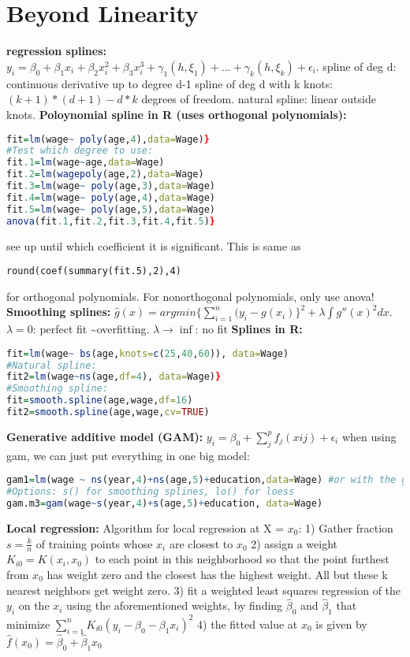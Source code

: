 \section{Beyond Linearity}
\textbf{regression splines: } 
$y_i = \beta_0 + \beta_1x_i + \beta_2x_i^2 + \beta_3x_i^3 + \gamma_1(h, \xi_1) + ... + \gamma_k(h, \xi_k) + \epsilon_i$.
spline of deg d: continuous derivative up to degree d-1
spline of deg d with k knots: $(k+1)*(d+1)-d*k$ degrees of freedom. 
natural spline: linear outside knots. 
\textbf{Poloynomial spline in R (uses orthogonal polynomials):} \begin{lstlisting}[language=R]
fit=lm(wage~ poly(age,4),data=Wage)}
#Test which degree to use:
fit.1=lm(wage~age,data=Wage)
fit.2=lm(wagepoly(age,2),data=Wage)
fit.3=lm(wage~ poly(age,3),data=Wage)
fit.4=lm(wage~ poly(age,4),data=Wage)
fit.5=lm(wage~ poly(age,5),data=Wage)
anova(fit.1,fit.2,fit.3,fit.4,fit.5)}\end{lstlisting} see up until which coefficient it is significant. This is same as \begin{lstlisting}
round(coef(summary(fit.5),2),4)
\end{lstlisting} for orthogonal polynomials. For nonorthogonal polynomials, only use anova!
\textbf{Smoothing splines: } $\hat g(x) = argmin \{\sum_{i=1}^n (y_i - g(x_i)\}^2 + \lambda \int g'' (x)^2 dx$. $\lambda = 0$: perfect fit \textasciitilde overfitting. $\lambda \rightarrow \inf$: no fit 
\textbf{Splines in R:}
\begin{lstlisting}[language=R] 
fit=lm(wage~ bs(age,knots=c(25,40,60)), data=Wage)
#Natural spline: 
fit2=lm(wage~ns(age,df=4), data=Wage)}
#Smoothing spline:
fit=smooth.spline(age,wage,df=16)
fit2=smooth.spline(age,wage,cv=TRUE)
\end{lstlisting}
\textbf{Generative additive model (GAM): } $y_i = \beta_0 + \sum_j^p f_j(xij) + \epsilon_i$
when using gam, we can just put everything in one big model:
\begin{lstlisting}[language=R]
gam1=lm(wage ~ ns(year,4)+ns(age,5)+education,data=Wage) #or with the gam library: 
#Options: s() for smoothing splines, lo() for loess
gam.m3=gam(wage~s(year,4)+s(age,5)+education, data=Wage)\end{lstlisting}

\textbf{Local regression: }
Algorithm for local regression at X = $x_0$: 1) Gather fraction $s = \frac{k}{n}$ of training points whose $x_i$ are closest to $x_0$ 2) assign a weight $K_{i0} = K(x_i, x_0)$ to each point in this neighborhood so that the point furthest from $x_0$ has weight zero and the closest has the highest weight. All but these k nearest neighbors get weight zero. 3) fit a weighted least squares regression of the $y_i$ on the $x_i$ using the aforementioned weights, by finding $\hat \beta_0$ and $\hat \beta_1$ that minimize $\sum_{i=1}^n K_{i0}(y_i-\beta_0-\beta_1x_i)^2$ 4) the fitted value at $x_0$ is given by $\hat f(x_0) = \hat \beta_0 + \hat \beta_1 x_0$
